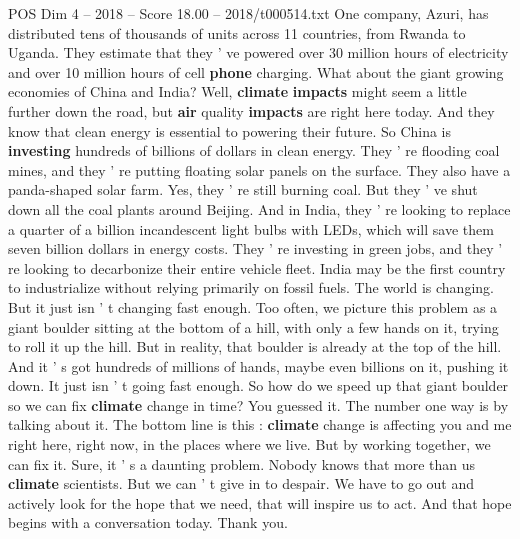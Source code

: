 \begin{textsample}{POS Dim 4 – 2018 – Score 18.00 – 2018/t000514.txt}
One company, Azuri, has distributed tens of thousands of units across 11 countries, from Rwanda to Uganda.
They estimate that they ' ve powered over 30 million hours of electricity and over 10 million hours of cell \textbf{phone} charging.
What about the giant growing economies of China and India?
Well, \textbf{climate} \textbf{impacts} might seem a little further down the road, but \textbf{air} quality \textbf{impacts} are right here today.
And they know that clean energy is essential to powering their future.
So China is \textbf{investing} hundreds of billions of dollars in clean energy.
They ' re flooding coal mines, and they ' re putting floating solar panels on the surface.
They also have a panda-shaped solar farm.
Yes, they ' re still burning coal.
But they ' ve shut down all the coal plants around Beijing.
And in India, they ' re looking to replace a quarter of a billion incandescent light bulbs with LEDs, which will save them seven billion dollars in energy costs.
They ' re investing in green jobs, and they ' re looking to decarbonize their entire vehicle fleet.
India may be the first country to industrialize without relying primarily on fossil fuels.
The world is changing.
But it just isn ' t changing fast enough.
Too often, we picture this problem as a giant boulder sitting at the bottom of a hill, with only a few hands on it, trying to roll it up the hill.
But in reality, that boulder is already at the top of the hill.
And it ' s got hundreds of millions of hands, maybe even billions on it, pushing it down.
It just isn ' t going fast enough.
So how do we speed up that giant boulder so we can fix \textbf{climate} change in time?
You guessed it.
The number one way is by talking about it.
The bottom line is this : \textbf{climate} change is affecting you and me right here, right now, in the places where we live.
But by working together, we can fix it.
Sure, it ' s a daunting problem.
Nobody knows that more than us \textbf{climate} scientists.
But we can ' t give in to despair.
We have to go out and actively look for the hope that we need, that will inspire us to act.
And that hope begins with a conversation today.
Thank you.

\end{textsample}
